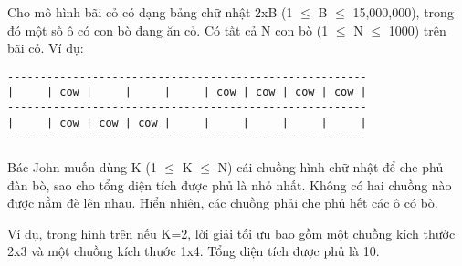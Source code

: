 Cho mô hình bãi cỏ có dạng bảng chữ nhật 2xB (1  $\le$  B  $\le$  15,000,000), trong đó một số ô có con bò đang ăn cỏ. Có tất cả N con bò (1  $\le$  N  $\le$  1000) trên bãi cỏ. Ví dụ:  
\begin{verbatim}
-------------------------------------------------------
|     | cow |     |     |     | cow | cow | cow | cow |
-------------------------------------------------------
|     | cow | cow | cow |     |     |     |     |     |
-------------------------------------------------------
\end{verbatim}

   Bác John muốn dùng K (1  $\le$  K  $\le$  N) cái chuồng hình chữ nhật để che phủ đàn bò, sao cho tổng diện tích được phủ là nhỏ nhất. Không có hai chuồng nào được nằm đè lên nhau. Hiển nhiên, các chuồng phải che phủ hết các ô có bò.  

   Ví dụ, trong hình trên nếu K=2, lời giải tối ưu bao gồm một chuồng kích thước 2x3 và một chuồng kích thước 1x4. Tổng diện tích được phủ là 10.